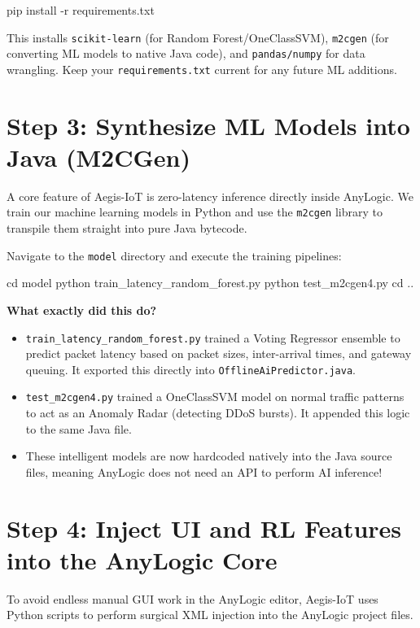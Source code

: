 \documentclass[12pt,a4paper]{article}
\begin{document}
\begin{terminalBox}
pip install -r requirements.txt
\end{terminalBox}

This installs \texttt{scikit-learn} (for Random Forest/OneClassSVM), \texttt{m2cgen} (for converting ML models to native Java code), and \texttt{pandas/numpy} for data wrangling. Keep your \texttt{requirements.txt} current for any future ML additions.

\section{Step 3: Synthesize ML Models into Java (M2CGen)}

A core feature of Aegis-IoT is zero-latency inference directly inside AnyLogic. We train our machine learning models in Python and use the \texttt{m2cgen} library to transpile them straight into pure Java bytecode.

Navigate to the \texttt{model} directory and execute the training pipelines:

\begin{terminalBox}[(ML Transpilation)]
cd model
python train\_latency\_random\_forest.py
python test\_m2cgen4.py
cd ..
\end{terminalBox}

\textbf{What exactly did this do?}
\begin{itemize}
    \item \texttt{train\_latency\_random\_forest.py} trained a Voting Regressor ensemble to predict packet latency based on packet sizes, inter-arrival times, and gateway queuing. It exported this directly into \texttt{OfflineAiPredictor.java}.
    \item \texttt{test\_m2cgen4.py} trained a OneClassSVM model on normal traffic patterns to act as an Anomaly Radar (detecting DDoS bursts). It appended this logic to the same Java file.
    \item These intelligent models are now hardcoded natively into the Java source files, meaning AnyLogic does not need an API to perform AI inference!
\end{itemize}

\section{Step 4: Inject UI and RL Features into the AnyLogic Core}

To avoid endless manual GUI work in the AnyLogic editor, Aegis-IoT uses Python scripts to perform surgical XML injection into the AnyLogic project files. 
\end{document}
